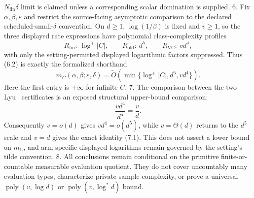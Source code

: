 \begin{proposition}
   \(N_{\mathrm{fin}}\delta\) limit is claimed unless a corresponding scalar
   domination is supplied.
6. Fix \(\alpha,\beta,\varepsilon\) and restrict the source-facing
   asymptotic comparison to the declared scheduled-small-\(\delta\)
   convention. On \(d\ge1\), \(\log(1/\beta)\) is fixed and \(v\ge1\), so
   the three displayed rate expressions have polynomial class-complexity
   profiles
   \[
   R_{\mathrm{fin}}:\ \log^+|C|,
   \qquad
   R_{\mathrm{old}}:\ d^5,
   \qquad
   R_{\mathrm{VC}}:\ vd^4,
   \tag{7.4}
   \]
   with only the setting-permitted displayed logarithmic factors suppressed.
   Thus (6.2) is exactly the formalized shorthand
   \[
   m_C(\alpha,\beta;\varepsilon,\delta)
   =\widetilde O\!\left(
   \min\{\log^+|C|,d^5,vd^4\}
   \right).
   \tag{7.5}
   \]
   Here the first entry is \(+\infty\) for infinite \(C\).
7. The comparison between the two Lyu~\citep{lyu2025} certificates is an exposed structural
   upper-bound comparison:
   \[
   \frac{vd^4}{d^5}=\frac vd.
   \tag{7.6}
   \]
   Consequently \(v=o(d)\) gives \(vd^4=o(d^5)\), while
   \(v=\Theta(d)\) returns to the \(d^5\) scale and \(v=d\) gives the exact
   identity (7.1). This does not assert a lower bound on \(m_C\), and
   arm-specific displayed logarithms remain governed by the setting's tilde
   convention.
8. All conclusions remain conditional on the primitive finite-or-countable
   measurable evaluation quotient. They do not cover uncountably many
   evaluation types, characterize private sample complexity, or prove a
   universal \(\operatorname{poly}(v,\log d)\) or
   \(\operatorname{poly}(v,\log^*d)\) bound.


\end{proposition}

